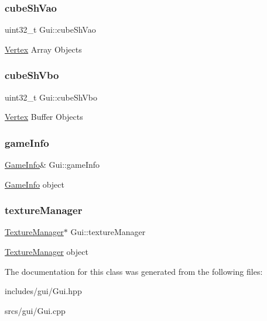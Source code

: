 \subsubsection{\texorpdfstring{cube\+Sh\+Vao}{cubeShVao}}
{\footnotesize\ttfamily uint32\+\_\+t Gui\+::cube\+Sh\+Vao}

\hyperlink{struct_vertex}{Vertex} Array Objects \mbox{\label{class_gui_ab9f1f53daba063532c91590af6a17bdf}} 
\subsubsection{\texorpdfstring{cube\+Sh\+Vbo}{cubeShVbo}}
{\footnotesize\ttfamily uint32\+\_\+t Gui\+::cube\+Sh\+Vbo}

\hyperlink{struct_vertex}{Vertex} Buffer Objects \mbox{\label{class_gui_af562e2e6f0b773511162d1a5171d7475}} 
\subsubsection{\texorpdfstring{game\+Info}{gameInfo}}
{\footnotesize\ttfamily \hyperlink{struct_game_info}{Game\+Info}\& Gui\+::game\+Info}

\hyperlink{struct_game_info}{Game\+Info} object \mbox{\label{class_gui_a5d8ee3bce3eda71d2223718ef121660c}} 
\subsubsection{\texorpdfstring{texture\+Manager}{textureManager}}
{\footnotesize\ttfamily \hyperlink{class_texture_manager}{Texture\+Manager}$\ast$ Gui\+::texture\+Manager}

\hyperlink{class_texture_manager}{Texture\+Manager} object 

The documentation for this class was generated from the following files\+:\begin{DoxyCompactItemize}
\item 
includes/gui/Gui.\+hpp\item 
srcs/gui/Gui.\+cpp\end{DoxyCompactItemize}
